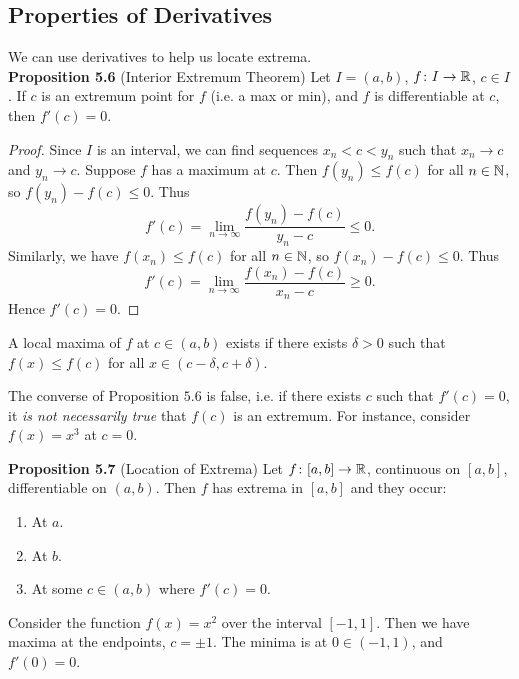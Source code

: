 \documentclass[class=article, crop=false]{standalone}
\begin{document}
  \subsection{Properties of Derivatives}
  We can use derivatives to help us locate extrema. \\
  \textbf{Proposition 5.6} (Interior Extremum Theorem) Let $I = (a, b)$, $f\colon I\to \mathbb{R}$, $c\in I$. If $c$ is an extremum point for $f$ (i.e. a max or min), and $f$ is differentiable at $c$, then $f'(c) = 0$.
  \begin{proof}
    Since $I$ is an interval, we can find sequences $x_n < c < y_n$ such that $x_n\to c$ and $y_n\to c$. Suppose $f$ has a maximum at $c$. Then $f(y_n)\leq f(c)$ for all $n\in\mathbb{N}$, so $f(y_n) - f(c)\leq 0$. Thus
    \[
      f'(c) = \lim_{n\to \infty} \frac{f(y_n) - f(c)}{y_n - c} \leq 0.
    \]
    Similarly, we have $f(x_n)\leq f(c)$ for all $n\in \mathbb{N}$, so $f(x_n) - f(c)\leq 0$. Thus
    \[
      f'(c) = \lim_{n\to \infty} \frac{f(x_n) - f(c)}{x_n - c} \geq 0.
    \]
    Hence $f'(c) = 0$.
  \end{proof}
  \begin{note}{}
    A local maxima of $f$ at $c\in (a, b)$ exists if there exists $\delta > 0$ such that $f(x)\leq f(c)$ for all $x\in (c - \delta, c + \delta)$.
  \end{note}
  \begin{note}{}
    The converse of Proposition $5.6$ is false, i.e. if there exists $c$ such that $f'(c) = 0$, it \emph{is not necessarily true} that $f(c)$ is an extremum. For instance, consider $f(x) = x^3$ at $c = 0$.
  \end{note}
  \textbf{Proposition 5.7} (Location of Extrema) Let $f\colon [a, b]\to \mathbb{R}$, continuous on $[a, b]$, differentiable on $(a, b)$. Then $f$ has extrema in $[a, b]$ and they occur:
  \begin{enumerate}[label=(\roman*)]
    \item At $a$.
    \item At $b$.
    \item At some $c\in (a, b)$ where $f'(c) = 0$.
  \end{enumerate}
  \begin{example}{}
    Consider the function $f(x) = x^2$ over the interval $[-1, 1]$. Then we have maxima at the endpoints, $c=\pm 1$. The minima is at $0\in (-1, 1)$, and $f'(0) = 0$.
  \end{example}
\end{document}
